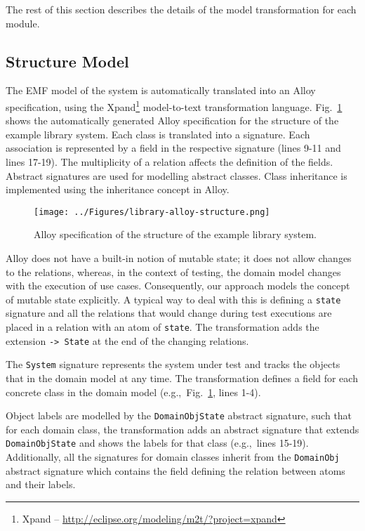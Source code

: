 The rest of this section describes the details of the model transformation for each module.

\subsection{Structure Model}
\label{sec:alloy-structure}
The EMF model of the system is automatically translated into an Alloy specification, using the Xpand\footnote{Xpand – \url{http://eclipse.org/modeling/m2t/?project=xpand}} model-to-text transformation language. Fig.~\ref{fig:library-alloy-structure} shows the automatically generated Alloy specification for the structure of the example library system. Each class is translated into a signature. Each association is represented by a field in the respective signature (lines 9-11 and lines 17-19). The multiplicity of a relation affects the definition of the fields. Abstract signatures are used for modelling abstract classes. Class inheritance is implemented using the inheritance concept in Alloy.

\begin{figure}[h]
\centering
\texttt{[image: ../Figures/library-alloy-structure.png]}
\caption{Alloy specification of the structure of the example library system.}
\label{fig:library-alloy-structure}
\end{figure}

Alloy does not have a built-in notion of mutable state; it does not allow changes to the relations, whereas, in the context of testing, the domain model changes with the execution of use cases. Consequently, our approach models the concept of mutable state  explicitly. A typical way to deal with this is defining a \texttt{state} signature and all the relations that would change during test executions are placed in a relation with an atom of \texttt{state}. The transformation adds the extension \texttt{-> State} at the end of the changing relations.

The \texttt{System} signature represents the system under test and tracks the objects that in the domain model at any time. The transformation defines a field for each concrete class in the domain model (e.g.,\ Fig.~\ref{fig:library-alloy-structure}, lines 1-4).

Object labels are modelled by the \texttt{DomainObjState} abstract signature, such that for each domain class, the transformation adds an abstract signature that extends \texttt{DomainObjState} and shows the labels for that class (e.g.,\ lines 15-19). Additionally, all the signatures for domain classes inherit from the \texttt{DomainObj} abstract signature which contains the field defining the relation between atoms and their labels.

